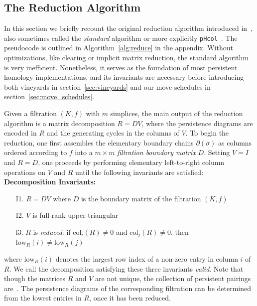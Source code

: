 \documentclass[sn-mathphys]{sn-jnl}
\begin{document}
\subsection{The Reduction Algorithm}\label{sec:reduction}
In this section we briefly recount the original reduction algorithm introduced in~\cite{zomorodian2005computing}, also sometimes called the \emph{standard} algorithm or more explicitly \texttt{pHcol}~\cite{de2011dualities}. 
The pseudocode is outlined in Algorithm~\ref{alg:reduce} in the appendix. Without optimizations, like   clearing   or implicit matrix reduction, the standard  algorithm is very inefficient. Nonetheless, it serves as the foundation of most persistent homology implementations, and its invariants are necessary before introducing both vineyards in section~\ref{sec:vineyards} and our move schedules  in section~\ref{sec:move_schedules}.


 Given a filtration $(K, f)$ with $m$ simplices,  the main output of the reduction algorithm is a matrix decomposition $R = D V$, where the persistence diagrams are encoded in $R$ and the generating cycles in the columns of $V$.
 To begin the reduction, one first   assembles the elementary boundary chains $\partial(\sigma)$ as columns ordered according to $f$ into a $m \times m$  \emph{filtration boundary matrix} $D$. Setting $V = I$ and $R = D$, one proceeds by performing elementary left-to-right column operations on $V$ and $R$ until the following invariants are satisfied:
\textbf{ Decomposition Invariants:}
 \begin{enumerate}[labelsep=3pt, topsep=2pt,itemsep=-0.25ex,parsep=1.0ex]\label{inv:decomposition}
 	\item[I1.] $R = D V$ where $D$ is the boundary matrix of the filtration $(K,f)$
 	\item[I2.] $V$ is full-rank upper-triangular
 	\item[l3.] $R$ is \emph{reduced}: if $\mathrm{col}_i(R) \neq 0$ and $\mathrm{col}_j(R) \neq 0$, then $\mathrm{low}_R(i) \neq \mathrm{low}_R(j)$ 
 	\end{enumerate} 
 \vspace*{1em}
 where $\mathrm{low}_R(i)$ denotes the largest row index of a non-zero entry in column $i$ of $R$. 
We call the decomposition satisfying these three invariants \emph{valid}. Note that though the matrices $R$ and $V$ are not unique, the collection of persistent pairings are~\cite{zomorodian2005computing}. The persistence diagrams of the corresponding filtration  can be determined from the lowest entries in $R$, once it has been reduced.
 
\end{document}
